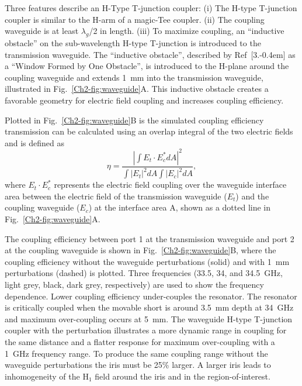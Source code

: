Three features describe an H-Type T-junction coupler: (i) The H-type T-junction coupler is similar to the H-arm of a magic-Tee coupler. \cite{ramo1984fields, MITRadWaveguide} (ii) The coupling waveguide is at least $\lambda_g$/2 in length. (iii) To maximize coupling, an ``inductive obstacle'' on the sub-wavelength H-type T-junction is introduced to the transmission waveguide. The ``inductive obstacle'', described by Ref~[3.\kern-0.4em] as a ``Window Formed by One Obstacle'', is introduced to the H-plane around the coupling waveguide and extends 1~mm into the transmission waveguide, illustrated in Fig.~\ref{Ch2-fig:waveguide}A. This inductive obstacle creates a favorable geometry for electric field coupling and increases coupling efficiency. 

Plotted in Fig.~\ref{Ch2-fig:waveguide}B is the simulated coupling efficiency transmission can be calculated using an overlap integral \cite{born} of the two electric fields and is defined as
\begin{equation}
    \eta = \frac{\left| \int E_{t} \cdot E^*_{c} dA\right|^2}{\int \left|E_t\right|^2 dA \int \left|E_c\right|^2 dA},
\end{equation}
where $E_{t} \cdot E^*_{c}$ represents the electric field coupling over the waveguide interface area between the electric field of the transmission waveguide ($E_{t}$) and the coupling waveguide ($E_{c}$) at the interface area A, shown as a dotted line in Fig.~\ref{Ch2-fig:waveguide}A. 

The coupling efficiency between port 1 at the transmission waveguide and port 2 at the coupling waveguide is shown in Fig.~\ref{Ch2-fig:waveguide}B, where the coupling efficiency without the waveguide perturbations (solid) and with 1~mm perturbations (dashed) is plotted. Three frequencies (33.5, 34, and 34.5~GHz, light grey, black, dark grey, respectively) are used to show the frequency dependence. Lower coupling efficiency under-couples the resonator. The resonator is critically coupled when the movable short is around 3.5~mm depth at 34~GHz and maximum over-coupling occurs at 5~mm. The waveguide H-type T-junction coupler with the perturbation illustrates a more dynamic range in coupling for the same distance and a flatter response for maximum over-coupling with a 1~GHz frequency range. To produce the same coupling range without the waveguide perturbations the iris must be 25\% larger. A larger iris leads to inhomogeneity of the H$_1$ field around the iris and in the region-of-interest. 

